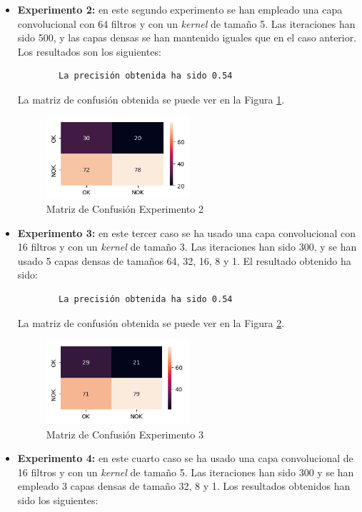 \begin{itemize}
    \item \textbf{Experimento 2:} en este segundo experimento se han empleado una capa convolucional con 64 filtros y con un \emph{kernel} de tamaño 5. Las iteraciones han sido 500, y las capas densas se han mantenido iguales que en el caso anterior. Los resultados son los siguientes:
    \begin{verbatim}
        La precisión obtenida ha sido 0.54
    \end{verbatim}
    La matriz de confusión obtenida se puede ver en la Figura \ref{f:exp2}.
    \begin{figure}[h]
     \centering
      \includegraphics[width=0.5\textwidth]{img/exp2.PNG}
     \caption{Matriz de Confusión Experimento 2}
     \label{f:exp2}
    \end{figure}
    \item \textbf{Experimento 3:} en este tercer caso se ha usado una capa convolucional con 16 filtros y con un \emph{kernel} de tamaño 3. Las iteraciones han sido 300, y se han usado 5 capas densas de tamaños 64, 32, 16, 8 y 1. El resultado obtenido ha sido:
    \begin{verbatim}
        La precisión obtenida ha sido 0.54
    \end{verbatim}
    La matriz de confusión obtenida se puede ver en la Figura \ref{f:exp3}.
    \begin{figure}[h]
     \centering
      \includegraphics[width=0.5\textwidth]{img/exp3.PNG}
     \caption{Matriz de Confusión Experimento 3}
     \label{f:exp3}
    \end{figure}
    \item \textbf{Experimento 4:} en este cuarto caso se ha usado una capa convolucional de 16 filtros y con un \emph{kernel} de tamaño 5. Las iteraciones han sido 300 y se han empleado 3 capas densas de tamaño 32, 8 y 1.  Los resultados obtenidos han sido los siguientes:

\end{itemize}
